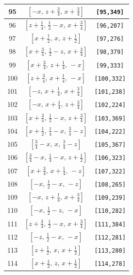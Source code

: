 \documentclass[fleqn,8pt]{jsarticle}
\begin{document}
\begin{longtable}{ccc}
95 & $\left[ - x,\, z + \frac{3}{4},\, x + \frac{3}{4} \right]$ & {\tt [95,349]} \\ \hline
96 & $\left[ z + \frac{1}{4},\, \frac{1}{2} - x,\, x + \frac{3}{4} \right]$ & {\tt [96,207]} \\ \hline
97 & $\left[ x + \frac{1}{2},\, x,\, z + \frac{1}{2} \right]$ & {\tt [97,276]} \\ \hline
98 & $\left[ x + \frac{3}{4},\, \frac{1}{2} - z,\, x + \frac{3}{4} \right]$ & {\tt [98,379]} \\ \hline
99 & $\left[ x + \frac{3}{4},\, z + \frac{1}{4},\, - x \right]$ & {\tt [99,333]} \\ \hline
100 & $\left[ z + \frac{3}{4},\, x + \frac{1}{4},\, - x \right]$ & {\tt [100,332]} \\ \hline
101 & $\left[ - z,\, x + \frac{1}{4},\, x + \frac{3}{4} \right]$ & {\tt [101,238]} \\ \hline
102 & $\left[ - x,\, x + \frac{1}{4},\, z + \frac{3}{4} \right]$ & {\tt [102,224]} \\ \hline
103 & $\left[ x + \frac{3}{4},\, \frac{1}{2} - x,\, z + \frac{3}{4} \right]$ & {\tt [103,369]} \\ \hline
104 & $\left[ x + \frac{1}{2},\, \frac{1}{4} - x,\, \frac{3}{4} - z \right]$ & {\tt [104,222]} \\ \hline
105 & $\left[ \frac{3}{4} - x,\, x,\, \frac{3}{4} - z \right]$ & {\tt [105,367]} \\ \hline
106 & $\left[ \frac{3}{4} - x,\, \frac{1}{4} - x,\, z + \frac{1}{2} \right]$ & {\tt [106,323]} \\ \hline
107 & $\left[ x + \frac{3}{4},\, x + \frac{1}{4},\, - z \right]$ & {\tt [107,322]} \\ \hline
108 & $\left[ - x,\, \frac{1}{2} - x,\, - z \right]$ & {\tt [108,265]} \\ \hline
109 & $\left[ - x,\, z + \frac{1}{4},\, x + \frac{3}{4} \right]$ & {\tt [109,239]} \\ \hline
110 & $\left[ - x,\, \frac{1}{2} - z,\, - x \right]$ & {\tt [110,282]} \\ \hline
111 & $\left[ z + \frac{3}{4},\, \frac{1}{2} - x,\, x + \frac{3}{4} \right]$ & {\tt [111,384]} \\ \hline
112 & $\left[ - z,\, \frac{1}{2} - x,\, - x \right]$ & {\tt [112,281]} \\ \hline
113 & $\left[ z + \frac{1}{2},\, x,\, x + \frac{1}{2} \right]$ & {\tt [113,280]} \\ \hline
114 & $\left[ x + \frac{1}{2},\, z,\, x + \frac{1}{2} \right]$ & {\tt [114,278]} \\ \hline

\end{longtable}
\end{document}
